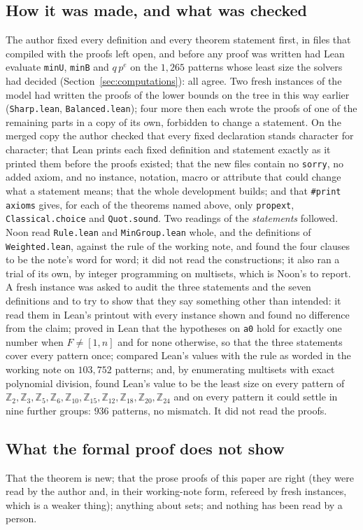 \documentclass[11pt,a4paper]{amsart}
\theoremstyle{definition}
\theoremstyle{remark}
\newcommand{\Z}{\mathbb{Z}}
\newcommand{\lean}[1]{\texttt{#1}}
\begin{document}
\subsection*{How it was made, and what was checked} The author fixed every definition and every theorem
statement first, in files that compiled with the proofs left open, and before any proof was written had Lean
evaluate \lean{minU}, \lean{minB} and $q\,p^{e}$ on the $1{,}265$ patterns whose least size the solvers had
decided (Section~\ref{sec:computations}): all agree. Two fresh instances of the model had written the proofs of the lower bounds on the tree in this way earlier (\lean{Sharp.lean}, \lean{Balanced.lean}); four more then each wrote the
proofs of one of the remaining parts in a copy of its own, forbidden to change a statement. On the merged copy the author
checked that every fixed declaration stands character for character; that Lean prints each fixed definition
and statement exactly as it printed them before the proofs existed; that the new files contain no
\lean{sorry}, no added axiom, and no instance, notation, macro or attribute that could change what a statement
means; that the whole development builds; and that \lean{\#print axioms} gives, for each of the theorems named
above, only \lean{propext}, \lean{Classical.choice} and \lean{Quot.sound}. Two readings of the \emph{statements} followed. Noon read \lean{Rule.lean} and \lean{MinGroup.lean} whole,
and the definitions of \lean{Weighted.lean}, against the rule of the working note, and found the four clauses
to be the note's word for word; it did not read the constructions; it also ran a trial of its own, by integer
programming on multisets, which is Noon's to report. A fresh instance was asked to audit the three statements
and the seven definitions and to try to show that they say something other than intended: it read them in
Lean's printout with every instance shown and found no difference from the claim; proved in Lean that the
hypotheses on \lean{a0} hold for exactly one number when $F\ne[1,n]$ and for none otherwise, so that the three
statements cover every pattern once; compared Lean's values with the rule as worded in the working note on
$103{,}752$ patterns; and, by enumerating multisets with exact polynomial division, found Lean's value to be
the least size on every pattern of $\Z_2,\Z_3,\Z_5,\Z_6,\Z_{10},\Z_{15},\Z_{12},\Z_{18},\Z_{20},\Z_{24}$ and on
every pattern it could settle in nine further groups: $936$ patterns, no mismatch. It did not read the proofs.

\subsection*{What the formal proof does not show} That the theorem is new; that the prose proofs of this
paper are right (they were read by the author and, in their working-note form, refereed by fresh instances,
which is a weaker thing); anything about sets; and nothing has been read by a person.
\end{document}
